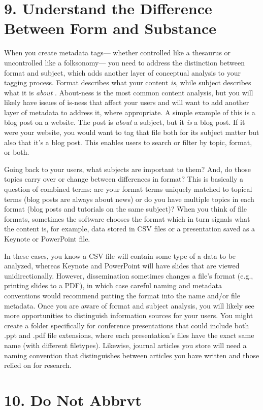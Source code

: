 \documentclass[10pt,letterpaper]{article}
\newcommand{\rulemajor}[1]{\section*{#1}}
\begin{document}
\rulemajor{9. Understand the Difference Between Form and Substance}

When you create metadata tags--- whether controlled like a thesaurus or
uncontrolled like a folksonomy--- you need to address the distinction
between format and subject, which adds another layer of conceptual
analysis to your tagging process. Format describes what your content
\emph{is}, while subject describes what it is \emph{about} \cite{Joudrey2015}.
About-ness is the most common content analysis, but you will likely have
issues of is-ness that affect your users and will want to add another
layer of metadata to address it, where appropriate. A simple example of
this is a blog post on a website.
The post is \emph{about} a subject, but it \emph{is} a blog post.
If it were your website, you would want to tag that file both for its
subject matter but also that it's a blog post.
This enables users to search or filter by topic, format, or both.

Going back to your users, what subjects are important to them? And, do
those topics carry over or change between differences in format? This is
basically a question of combined terms: are your format terms uniquely
matched to topical terms (blog posts are always about news) or do you
have multiple topics in each format (blog posts and tutorials on the
same subject)? When you think of file formats, sometimes the software
chooses the format which in turn signals what the content is, for
example, data stored in CSV files or a presentation saved as a Keynote
or PowerPoint file.

In these cases, you know a CSV file will contain some type of a data to
be analyzed, whereas Keynote and PowerPoint will have slides that are
viewed unidirectionally. However, dissemination sometimes changes a
file's format (e.g., printing slides to a PDF), in which case careful
naming and metadata conventions would recommend putting the format into
the name and/or file metadata. Once you are aware of format and subject
analysis, you will likely see more opportunities to distinguish
information sources for your users. You might create a folder
specifically for conference presentations that could include both .ppt
and .pdf file extensions, where each presentation's files have the exact
same name (with different filetypes).
Likewise, journal articles you store will need a naming convention that
distinguishes between articles you have written and those relied on for
research.

\rulemajor{10. Do Not Abbrvt}
\end{document}
